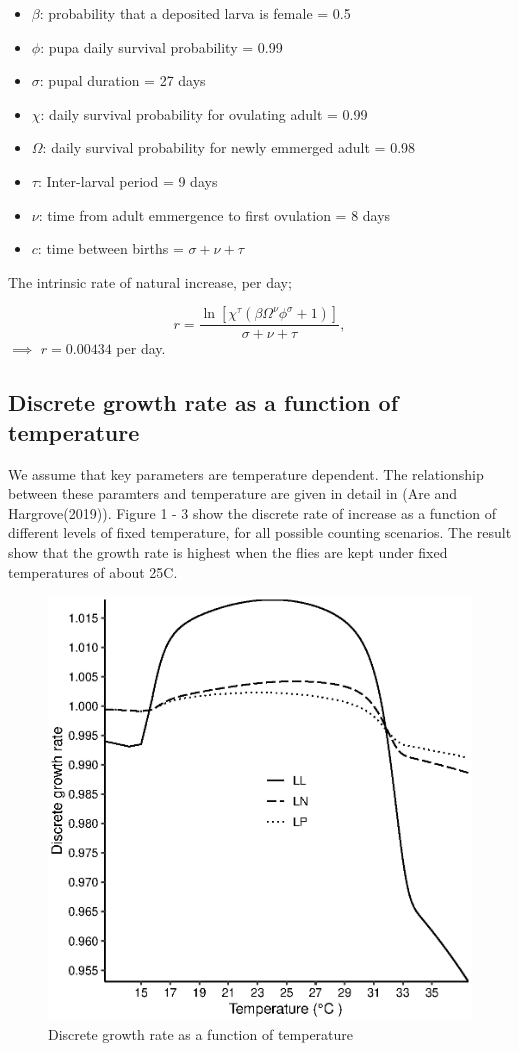 \documentclass[10pt,a4paper]{article}
\begin{document}
\begin{itemize}
\item $\beta$: probability that a deposited larva is female = 0.5
\item $\phi$:  pupa daily survival probability = 0.99
\item $\sigma$: pupal duration = 27 days 
\item $\chi$:  daily survival probability for ovulating adult = 0.99
\item $\Omega$:  daily survival probability for newly emmerged adult = 0.98
\item $\tau$:  Inter-larval period = 9 days
\item $\nu$:   time  from adult emmergence to first ovulation = 8 days 
\item $c$:   time between births = $\sigma + \nu + \tau $
\end{itemize}
The intrinsic rate of natural increase, per day; 


$$r = \frac{\ln[\chi^\tau(\beta \Omega^\nu\phi^\sigma + 1 )]}{\sigma + \nu + \tau},$$ $\implies$ $r = 0.00434$ per day. 

\subsection*{Discrete growth rate as a function of temperature}

We assume that key parameters are temperature dependent. The relationship between these paramters and temperature are given in detail in (Are and Hargrove(2019)). Figure 1 - 3 show the discrete rate of increase as a function of different levels of fixed temperature, for all possible counting scenarios. The result show that the growth rate is highest when the flies are kept under fixed temperatures of about 25\degree C.

\begin{figure}[hbt!]
	\centering
	\includegraphics[width=0.7\linewidth]{LNLP}
	\caption{Discrete growth rate as a function of temperature}
	\label{fig:tsetseflowchat3}
\end{figure}
\end{document}
